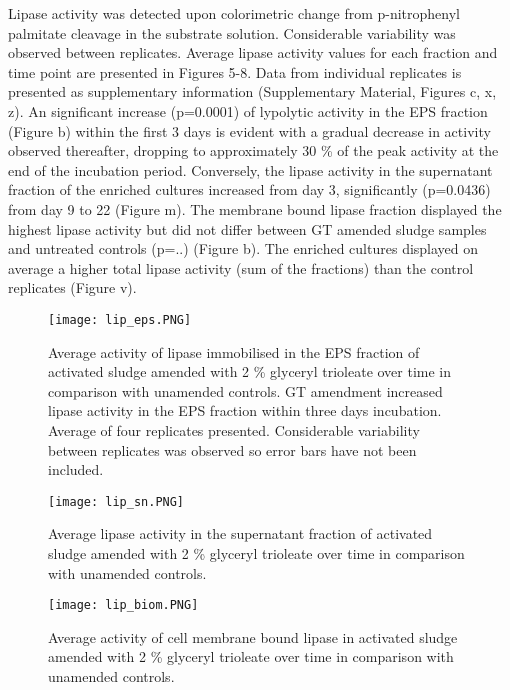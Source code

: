 \documentclass[twoside]{article}
\begin{document}
Lipase activity was detected upon colorimetric change from p-nitrophenyl palmitate cleavage in the substrate solution. 
Considerable variability was observed between replicates. Average lipase activity values for each fraction and time point are presented in Figures 5-8. Data from individual replicates is presented as supplementary information (Supplementary Material,  Figures c, x, z).
An significant increase (p=0.0001) of lypolytic activity in the EPS fraction (Figure b) within the first 3 days is evident with a gradual decrease in activity observed thereafter, dropping to approximately 30 \% of the peak activity at  the end of the incubation period. 
Conversely, the lipase activity in the supernatant fraction of the enriched cultures increased from day 3,  significantly (p=0.0436) from day 9 to 22 (Figure m). The membrane bound lipase fraction displayed the highest lipase activity but did not differ between GT amended sludge samples and untreated controls (p=..) (Figure b). The enriched cultures displayed on average a higher total lipase activity (sum of the fractions) than the control replicates (Figure v).
\begin{figure}
\texttt{[image: lip\_eps.PNG]}
\caption{Average activity of lipase immobilised in the EPS fraction of activated sludge amended with 2 \% glyceryl trioleate over time in comparison with unamended controls. GT amendment increased lipase activity in the EPS fraction within three days incubation. Average of four replicates presented. Considerable variability between replicates was observed so error bars have not been included.}
\end{figure}
\begin{figure}
\texttt{[image: lip\_sn.PNG]}
\caption{Average lipase activity in the supernatant fraction of activated sludge amended with 2 \% glyceryl trioleate over time in comparison with unamended controls.}
\end{figure}

\begin{figure}
\texttt{[image: lip\_biom.PNG]}
\caption{Average activity of cell membrane bound lipase in activated sludge amended with 2 \% glyceryl trioleate over time in comparison with unamended controls.}
\end{figure}
\end{document}
